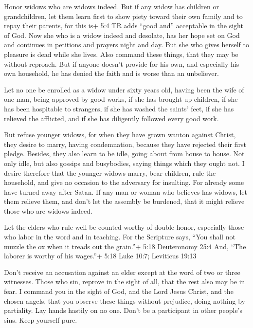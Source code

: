  Honor widows who are widows indeed.  But if any
widow has children or grandchildren, let them learn first to show piety
toward their own family and to repay their parents, for this is+ 5:4 TR
adds ``good and'' acceptable in the sight of God.  Now she
who is a widow indeed and desolate, has her hope set on God and
continues in petitions and prayers night and day.  But she
who gives herself to pleasure is dead while she lives.  Also
command these things, that they may be without reproach. 
But if anyone doesn't provide for his own, and especially his own
household, he has denied the faith and is worse than an unbeliever.

 Let no one be enrolled as a widow under sixty years old,
having been the wife of one man,  being approved by good
works, if she has brought up children, if she has been hospitable to
strangers, if she has washed the saints' feet, if she has relieved the
afflicted, and if she has diligently followed every good work.

 But refuse younger widows, for when they have grown wanton
against Christ, they desire to marry,  having condemnation,
because they have rejected their first pledge.  Besides,
they also learn to be idle, going about from house to house. Not only
idle, but also gossips and busybodies, saying things which they ought
not.  I desire therefore that the younger widows marry,
bear children, rule the household, and give no occasion to the adversary
for insulting.  For already some have turned away after
Satan.  If any man or woman who believes has widows, let
them relieve them, and don't let the assembly be burdened, that it might
relieve those who are widows indeed.

 Let the elders who rule well be counted worthy of double
honor, especially those who labor in the word and in teaching.
 For the Scripture says, ``You shall not muzzle the ox when
it treads out the grain.''+ 5:18 Deuteronomy 25:4 And, ``The laborer is
worthy of his wages.''+ 5:18 Luke 10:7; Leviticus 19:13

 Don't receive an accusation against an elder except at the
word of two or three witnesses.  Those who sin, reprove in
the sight of all, that the rest also may be in fear.  I
command you in the sight of God, and the Lord Jesus Christ, and the
chosen angels, that you observe these things without prejudice, doing
nothing by partiality.  Lay hands hastily on no one. Don't
be a participant in other people's sins. Keep yourself pure.


